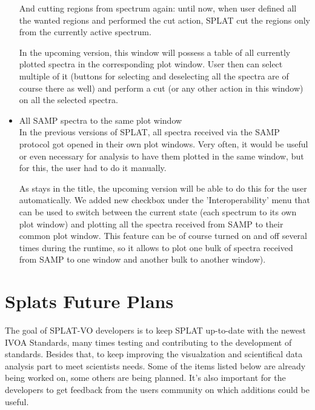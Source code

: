 \documentclass[final,authoryear,5p,times,twocolumn]{elsarticle}
\begin{document}
\begin{itemize}
And cutting regions from spectrum again: until now, when user defined all the wanted regions and performed the cut action, SPLAT cut the regions only from the currently active spectrum.

In the upcoming version, this window will possess a table of all currently plotted spectra in the corresponding plot window. User then can select multiple of it (buttons for selecting and deselecting all the spectra are of course there as well) and perform a cut (or any other action in this window) on all the selected spectra.

\item All SAMP spectra to the same plot window\\

In the previous versions of SPLAT, all spectra received via the SAMP protocol got opened in their own plot windows. Very often, it would be useful or even necessary for analysis to have them plotted in the same window, but for this, the user had to do it manually.

As stays in the title, the upcoming version will be able to do this for the user automatically. We added new checkbox under the 'Interoperability' menu that can be used to switch between the current state (each spectrum to its own plot window) and plotting all the spectra received from SAMP to their common plot window. This feature can be of course turned on and off several times during the runtime, so it allows to plot one bulk of spectra received from SAMP to one window and another bulk to another window).

\end{itemize}

\section{Splats Future Plans}
The goal of SPLAT-VO developers is to keep SPLAT up-to-date with the newest IVOA Standards, many times  testing and contributing to the development of standards. Besides that, to keep improving the visualzation and scientifical data analysis part to meet scientists needs.
Some of the items listed below are already being worked on, some others are being planned. It's also important for the developers to get feedback
from the users community on which additions could be useful.
\end{document}
